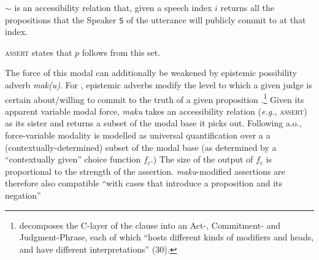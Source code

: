 	$ \sim $ is an accessibility relation that, given a speech index $ i $ returns all the propositions that the Speaker \texttt{S} of the utterance will publicly commit to at that index.
	
	\textsc{assert} states that $ p $ follows from this set.
	\xe%
	
	The force of this modal can additionally be weakened by epistemic possibility adverb \textit{mak(u)}. For \citeauthor{Krifka2021}, epistemic adverbs modify the level to which a given judge is certain about/willing to commit to the truth of a given proposition \citeyearpar[12]{Krifka2021}.\footnote{\citet{Krifka2021} decomposes the C-layer of the clause into an Act-, Commitment- and Judgment-Phrase, each of which ``hosts different kinds of modifiers and heads, and have different interpretations'' (30).} Given its apparent variable modal force, \textit{maku} takes an accessibility relation (\textit{e.g.}, \textsc{assert}) as its sister and returns a subset of the modal base it picks out.  Following \citealt{Matthewson2010,Rullmann2008} a.o., force-variable modality is modelled as universal quantification over a a (contextually-determined) subset of the modal base (as determined by a ``contextually given'' choice function $ f_c $.) The size of the output of $ f_c $ is proportional to the strength of the assertion. \textit{maku}-modified assertions are therefore also compatible ``with cases that introduce a proposition and its negation'' \citetext{\citealp[13]{Krifka2021}, compare () above.}
	
	
